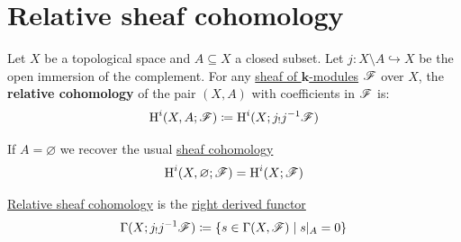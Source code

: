 \documentclass[../../main]{subfiles}
\begin{document}
\begin{theorem}

\end{theorem}

\section{Relative sheaf cohomology}

\begin{definition}\label{def:relative-sheaf-cohomology}
  Let \(X\) be a topological space and \(A \subseteq X\) a closed subset.
  Let \(j\colon X \setminus A \hookrightarrow X\) be the open immersion of the complement.
  For any \hyperref[def:sheaf]{sheaf of \(\mathbf{k}\)-modules} \(\mathscr{F}\) over \(X\), the \textbf{relative cohomology} of the pair \((X, A)\) with coefficients in \(\mathscr{F}\) is:
  \begin{equation*}
    \operatorname{H}^{i}(X, A; \mathscr{F}) \coloneq \operatorname{H}^{i}(X; j_{!}j^{-1}\mathscr{F})
  \end{equation*}

  If \(A = \varnothing\) we recover the usual \hyperref[def:sheaf-cohomology]{sheaf cohomology}
  \begin{equation*}
    \operatorname{H}^{i}(X, \varnothing; \mathscr{F}) = \operatorname{H}^{i}(X; \mathscr{F})
  \end{equation*}
\end{definition}

\begin{remark}
  \hyperref[def:relative-sheaf-cohomology]{Relative sheaf cohomology} is the \hyperref[def:right-derived-functor]{right derived functor}
  \begin{equation*}
    \Gamma(X; j_{!}j^{-1}\mathscr{F}) \coloneq \left\{ s \in \Gamma(X, \mathscr{F}) \mid s|_{A} = 0\right\}
  \end{equation*}
\end{remark}
\end{document}
